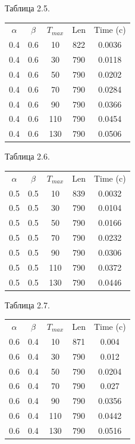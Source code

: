 \documentclass[12pt]{report}
\begin{document}
	\begin{minipage}{0.5\textwidth}
		\begin{center}
			Таблица 2.5.
			
		\begin{tabular}{|c c c c c|}
			\hline
			$\alpha$ & $\beta$ & $T_{max}$ & Len & Time (c) \\ [0.5ex]
			0.4 & 0.6 & 10 & 822 & 0.0036 \\ 
			\hline 
			0.4 & 0.6 & 30 & 790 & 0.0118 \\ 
			\hline 
			0.4 & 0.6 & 50 & 790 & 0.0202 \\ 
			\hline 
			0.4 & 0.6 & 70 & 790 & 0.0284 \\ 
			\hline 
			0.4 & 0.6 & 90 & 790 & 0.0366 \\ 
			\hline 
			0.4 & 0.6 & 110 & 790 & 0.0454 \\ 
			\hline 
			0.4 & 0.6 & 130 & 790 & 0.0506 \\ 
			\hline 
		\end{tabular}
			
			Таблица 2.6.
			
			\begin{tabular}{|c c c c c|}
				\hline
				$\alpha$ & $\beta$ & $T_{max}$ & Len & Time (c) \\ [0.5ex]
				0.5 & 0.5 & 10 & 839 & 0.0032 \\ 
				\hline 
				0.5 & 0.5 & 30 & 790 & 0.0104 \\ 
				\hline 
				0.5 & 0.5 & 50 & 790 & 0.0166 \\ 
				\hline 
				0.5 & 0.5 & 70 & 790 & 0.0232 \\ 
				\hline 
				0.5 & 0.5 & 90 & 790 & 0.0306 \\ 
				\hline 
				0.5 & 0.5 & 110 & 790 & 0.0372 \\ 
				\hline 
				0.5 & 0.5 & 130 & 790 & 0.0446 \\ 
				\hline 
			\end{tabular}
			
			Таблица 2.7.
			
			\begin{tabular}{|c c c c c|}
				\hline
				$\alpha$ & $\beta$ & $T_{max}$ & Len & Time (c) \\ [0.5ex]
				0.6 & 0.4 & 10 & 871 & 0.004 \\ 
				\hline 
				0.6 & 0.4 & 30 & 790 & 0.012 \\ 
				\hline 
				0.6 & 0.4 & 50 & 790 & 0.0204 \\ 
				\hline 
				0.6 & 0.4 & 70 & 790 & 0.027 \\ 
				\hline 
				0.6 & 0.4 & 90 & 790 & 0.0356 \\ 
				\hline 
				0.6 & 0.4 & 110 & 790 & 0.0442 \\ 
				\hline 
				0.6 & 0.4 & 130 & 790 & 0.0516 \\ 
				\hline 
			\end{tabular}
			

\end{center}
\end{minipage}
\end{document}
